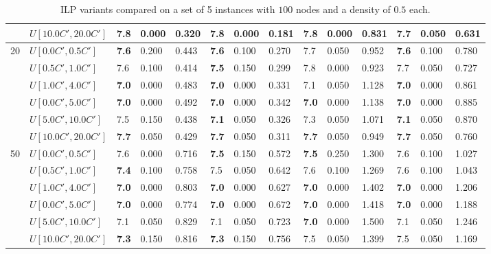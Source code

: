 \begin{table}[h]
{\begin{tabular}{|l|l||l|l|l||l|l|l||l|l|l||l|l|l|}
       & $U[10.0C',20.0C']$ & 7.8 & 0.000 & 0.320 & 7.8 & 0.000 & 0.181 & 7.8 & 0.000 & 0.831 & \textbf{7.7} & 0.050 & 0.631 \\
      \hline\hline
      \multirow{6}{*}{20} & $U[0.0C',0.5C']$ & \textbf{7.6} & 0.200 & 0.443 & \textbf{7.6} & 0.100 & 0.270 & 7.7 & 0.050 & 0.952 & \textbf{7.6} & 0.100 & 0.780 \\
       & $U[0.5C',1.0C']$ & 7.6 & 0.100 & 0.414 & \textbf{7.5} & 0.150 & 0.299 & 7.8 & 0.000 & 0.923 & 7.7 & 0.050 & 0.727 \\
       & $U[1.0C',4.0C']$ & \textbf{7.0} & 0.000 & 0.483 & \textbf{7.0} & 0.000 & 0.331 & 7.1 & 0.050 & 1.128 & \textbf{7.0} & 0.000 & 0.861 \\
       & $U[0.0C',5.0C']$ & \textbf{7.0} & 0.000 & 0.492 & \textbf{7.0} & 0.000 & 0.342 & \textbf{7.0} & 0.000 & 1.138 & \textbf{7.0} & 0.000 & 0.885 \\
       & $U[5.0C',10.0C']$ & 7.5 & 0.150 & 0.438 & \textbf{7.1} & 0.050 & 0.326 & 7.3 & 0.050 & 1.071 & \textbf{7.1} & 0.050 & 0.870 \\
       & $U[10.0C',20.0C']$ & \textbf{7.7} & 0.050 & 0.429 & \textbf{7.7} & 0.050 & 0.311 & \textbf{7.7} & 0.050 & 0.949 & \textbf{7.7} & 0.050 & 0.760 \\
      \hline\hline
      \multirow{6}{*}{50} & $U[0.0C',0.5C']$ & 7.6 & 0.000 & 0.716 & \textbf{7.5} & 0.150 & 0.572 & \textbf{7.5} & 0.250 & 1.300 & 7.6 & 0.100 & 1.027 \\
       & $U[0.5C',1.0C']$ & \textbf{7.4} & 0.100 & 0.758 & 7.5 & 0.050 & 0.642 & 7.6 & 0.100 & 1.269 & 7.6 & 0.100 & 1.043 \\
       & $U[1.0C',4.0C']$ & \textbf{7.0} & 0.000 & 0.803 & \textbf{7.0} & 0.000 & 0.627 & \textbf{7.0} & 0.000 & 1.402 & \textbf{7.0} & 0.000 & 1.206 \\
       & $U[0.0C',5.0C']$ & \textbf{7.0} & 0.000 & 0.774 & \textbf{7.0} & 0.000 & 0.672 & \textbf{7.0} & 0.000 & 1.418 & \textbf{7.0} & 0.000 & 1.188 \\
       & $U[5.0C',10.0C']$ & 7.1 & 0.050 & 0.829 & 7.1 & 0.050 & 0.723 & \textbf{7.0} & 0.000 & 1.500 & 7.1 & 0.050 & 1.246 \\
       & $U[10.0C',20.0C']$ & \textbf{7.3} & 0.150 & 0.816 & \textbf{7.3} & 0.150 & 0.756 & 7.5 & 0.050 & 1.399 & 7.5 & 0.050 & 1.169 \\
      \hline
      \end{tabular}
      }
      \caption{ILP variants compared on a set of 5 instances with $100$ nodes and a density of $0.5$ each.}
      \label{tab:pcpn100ILPVariant}\end{table}
      
